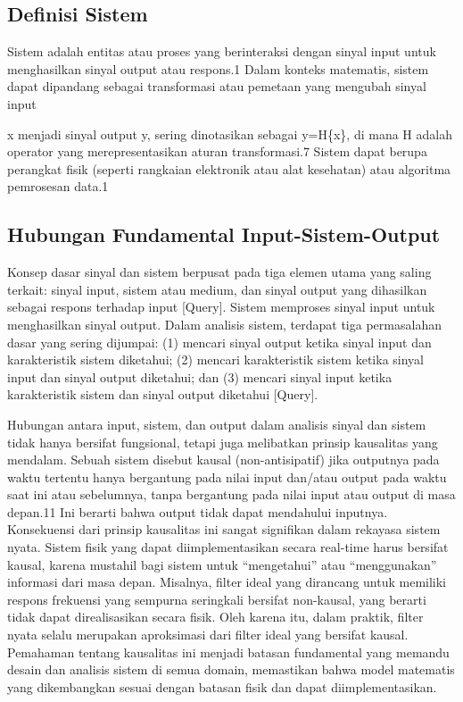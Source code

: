 \documentclass[
  letterpaper,
  DIV=11,
  numbers=noendperiod]{scrreprt}
\begin{document}
\subsection{Definisi Sistem}\label{definisi-sistem}

Sistem adalah entitas atau proses yang berinteraksi dengan sinyal input
untuk menghasilkan sinyal output atau respons.1 Dalam konteks matematis,
sistem dapat dipandang sebagai transformasi atau pemetaan yang mengubah
sinyal input

x menjadi sinyal output y, sering dinotasikan sebagai y=H\{x\}, di mana
H adalah operator yang merepresentasikan aturan transformasi.7 Sistem
dapat berupa perangkat fisik (seperti rangkaian elektronik atau alat
kesehatan) atau algoritma pemrosesan data.1

\subsection{Hubungan Fundamental
Input-Sistem-Output}\label{hubungan-fundamental-input-sistem-output}

Konsep dasar sinyal dan sistem berpusat pada tiga elemen utama yang
saling terkait: sinyal input, sistem atau medium, dan sinyal output yang
dihasilkan sebagai respons terhadap input {[}Query{]}. Sistem memproses
sinyal input untuk menghasilkan sinyal output. Dalam analisis sistem,
terdapat tiga permasalahan dasar yang sering dijumpai: (1) mencari
sinyal output ketika sinyal input dan karakteristik sistem diketahui;
(2) mencari karakteristik sistem ketika sinyal input dan sinyal output
diketahui; dan (3) mencari sinyal input ketika karakteristik sistem dan
sinyal output diketahui {[}Query{]}.

Hubungan antara input, sistem, dan output dalam analisis sinyal dan
sistem tidak hanya bersifat fungsional, tetapi juga melibatkan prinsip
kausalitas yang mendalam. Sebuah sistem disebut kausal (non-antisipatif)
jika outputnya pada waktu tertentu hanya bergantung pada nilai input
dan/atau output pada waktu saat ini atau sebelumnya, tanpa bergantung
pada nilai input atau output di masa depan.11 Ini berarti bahwa output
tidak dapat mendahului inputnya. Konsekuensi dari prinsip kausalitas ini
sangat signifikan dalam rekayasa sistem nyata. Sistem fisik yang dapat
diimplementasikan secara real-time harus bersifat kausal, karena
mustahil bagi sistem untuk ``mengetahui'' atau ``menggunakan'' informasi
dari masa depan. Misalnya, filter ideal yang dirancang untuk memiliki
respons frekuensi yang sempurna seringkali bersifat non-kausal, yang
berarti tidak dapat direalisasikan secara fisik. Oleh karena itu, dalam
praktik, filter nyata selalu merupakan aproksimasi dari filter ideal
yang bersifat kausal. Pemahaman tentang kausalitas ini menjadi batasan
fundamental yang memandu desain dan analisis sistem di semua domain,
memastikan bahwa model matematis yang dikembangkan sesuai dengan batasan
fisik dan dapat diimplementasikan.
\end{document}
